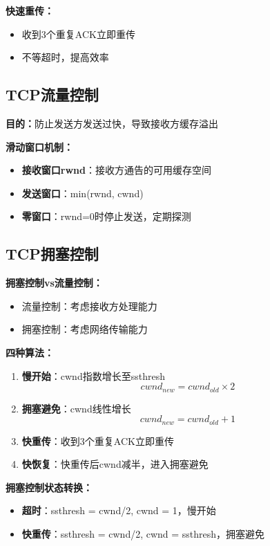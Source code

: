 \documentclass[lang=cn,newtx,10pt,scheme=chinese]{../../elegantbook}
\begin{document}
\textbf{快速重传：}
\begin{itemize}
  \item 收到3个重复ACK立即重传
  \item 不等超时，提高效率
\end{itemize}

\subsection{TCP流量控制}

\textbf{目的：}防止发送方发送过快，导致接收方缓存溢出

\textbf{滑动窗口机制：}
\begin{itemize}
  \item \textbf{接收窗口rwnd}：接收方通告的可用缓存空间
  \item \textbf{发送窗口}：min(rwnd, cwnd)
  \item \textbf{零窗口}：rwnd=0时停止发送，定期探测
\end{itemize}

\subsection{TCP拥塞控制}

\textbf{拥塞控制vs流量控制：}
\begin{itemize}
  \item 流量控制：考虑接收方处理能力
  \item 拥塞控制：考虑网络传输能力
\end{itemize}

\textbf{四种算法：}

\begin{enumerate}
  \item \textbf{慢开始}：cwnd指数增长至ssthresh
    \[cwnd_{new} = cwnd_{old} \times 2\]
  
  \item \textbf{拥塞避免}：cwnd线性增长
    \[cwnd_{new} = cwnd_{old} + 1\]
  
  \item \textbf{快重传}：收到3个重复ACK立即重传
  
  \item \textbf{快恢复}：快重传后cwnd减半，进入拥塞避免
\end{enumerate}

\textbf{拥塞控制状态转换：}
\begin{itemize}
  \item \textbf{超时}：ssthresh = cwnd/2, cwnd = 1，慢开始
  \item \textbf{快重传}：ssthresh = cwnd/2, cwnd = ssthresh，拥塞避免
\end{itemize}
\end{document}
